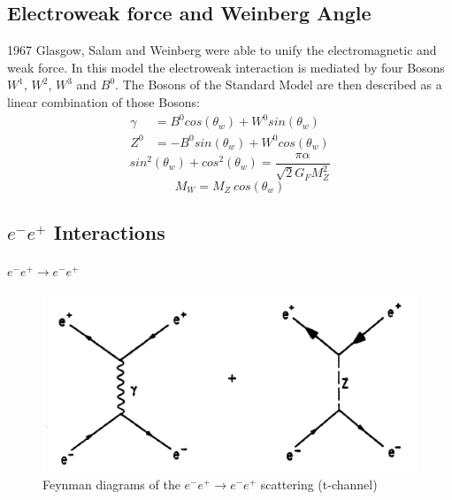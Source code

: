 \subsection{Electroweak force and Weinberg Angle}
1967 Glasgow, Salam and Weinberg were able to unify the electromagnetic and weak force. In this model the electroweak interaction is mediated by four Bosons $W^1$, $W^2$, $W^3$ and $B^0$. The Bosons of the Standard Model are then described as a linear combination of those Bosons\cite{Grif}:
\begin{equation}
\begin{aligned}
\gamma &= B^0 cos(\theta_w) + W^0 sin(\theta_w) \\
Z^0 &= -B^0 sin(\theta_w) + W^0 cos(\theta_w)
\end{aligned}
\end{equation}
\begin{equation}
sin^2(\theta_w)+cos^2(\theta_w) = \frac{\pi\alpha}{\sqrt{2}G_FM_Z^2}
\end{equation}
\begin{equation}
M_W = M_Z~cos(\theta_w)
\end{equation}

\subsection{$e^-e^+$ Interactions}
\paragraph{$e^-e^+ \rightarrow e^-e^+$}

\begin{figure}[hb]
	\centering
	\includegraphics{graphics/BhabbaStreuung.png}
	\caption{Feynman diagrams of the $e^-e^+ \rightarrow e^-e^+$ scattering (t-channel)}
	\label{fig:principles:BhabbaStreuung.png}
\end{figure}
 
